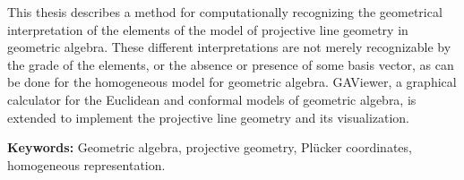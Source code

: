 This thesis describes a method for computationally recognizing the geometrical interpretation of the elements of the model of projective line geometry in geometric algebra.  These different interpretations are not merely recognizable by the grade of the elements, or the absence or presence of some basis vector, as can be done for the homogeneous model for geometric algebra.  GAViewer, a graphical calculator for the Euclidean and conformal models of geometric algebra, is extended to implement the projective line geometry and its visualization.

\textbf{Keywords:} Geometric algebra, projective geometry, Pl\"ucker coordinates, homogeneous representation.
